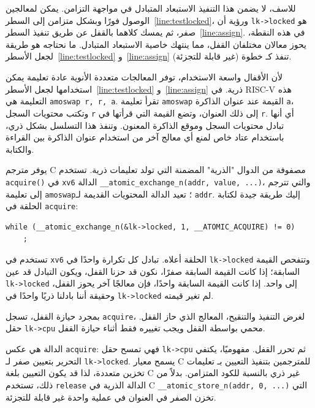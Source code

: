 للاسف، لا يضمن هذا التنفيذ الاستبعاد المتبادل في مواجهة التزامن.
يمكن لمعالجين الوصول فورًا وبشكل متزامن إلى السطر~\ref{line:testlocked}، ورؤية أن \lstinline{lk->locked} هو صفر، ثم يمسك كلاهما بالقفل عن طريق تنفيذ السطر~\ref{line:assign}.
في هذه النقطة، يحوز معالان مختلفان القفل، مما ينتهك خاصية الاستبعاد المتبادل.
ما نحتاجه هو طريقة لجعل الأسطر~\ref{line:testlocked} و~\ref{line:assign} تنفذ كـ خطوة  (غير قابلة للتجزئة).

لأن الأقفال واسعة الاستخدام، توفر المعالجات متعددة الأنوية عادة تعليمة يمكن استخدامها لجعل الأسطر~\ref{line:testlocked} و~\ref{line:assign} ذرية.
في RISC-V هذه التعليمة هي \lstinline{amoswap r, r, a}.
تقرأ تعليمة \lstinline{amoswap} القيمة عند عنوان الذاكرة {\tt a}، وتكتب محتويات السجل {\tt r} إلى ذلك العنوان، وتضع القيمة التي قرأتها في {\tt r}.
أي أنها تبادل محتويات السجل وموقع الذاكرة المعنون.
وتنفذ هذا التسلسل بشكل ذري، باستخدام عتاد خاص لمنع أي معالج آخر من استخدام عنوان الذاكرة بين القراءة والكتابة.

يوفر مترجم C مصفوفة من الدوال "الذرية" المضمنة التي تولد تعليمات ذرية.
تستخدم \lstinline{acquire()} في \texttt{xv6} الدالة \lstinline{__atomic_exchange_n(addr, value, ...)}، والتي تترجم إلى تعليمة \lstinline{amoswap}؛
تعيد الدالة المحتويات القديمة لـ {\tt *addr}.
إليك طريقة جيدة لكتابة الحلقة في {\tt acquire}:
\begin{lstlisting}[]
  while (__atomic_exchange_n(&lk->locked, 1, __ATOMIC_ACQUIRE) != 0)
    ;
\end{lstlisting}

تستخدم  في \texttt{xv6} الحلقة أعلاه.
تبادل كل تكرارة واحدًا في \lstinline{lk->locked} وتتفحص القيمة السابقة؛
إذا كانت القيمة السابقة صفرًا، نكون قد حزنا القفل، ويكون التبادل قد عين \lstinline{lk->locked} إلى واحد.
إذا كانت القيمة السابقة واحدًا، فإن معالجًا آخر يحوز القفل، وحقيقة أننا بادلنا ذريًا واحدًا في \lstinline{lk->locked} لم تغير قيمته.

بمجرد حيازة القفل، تسجل \lstinline{acquire}، لغرض التنفيذ والتنقيح، المعالج الذي حاز القفل.
حقل \lstinline{lk->cpu} محمي بواسطة القفل ويجب تغييره فقط أثناء حيازة القفل.

الدالة   هي عكس \lstinline{acquire}:
فهي تمسح حقل \lstinline{lk->cpu} ثم تحرر القفل.
مفهوميًا، يكتفي التحرير بتعيين صفر لـ \lstinline{lk->locked}.
يسمح معيار C للمترجمين بتنفيذ التعيين بـ تعليمات تخزين متعددة، لذا قد يكون التعيين بلغة C غير ذري بالنسبة للكود المتزامن.
بدلاً من ذلك، تستخدم \lstinline{release} الدالة الذرية في C \lstinline{__atomic_store_n(addr, 0, ...)} التي تخزن الصفر في العنوان في عملية واحدة غير قابلة للتجزئة.

